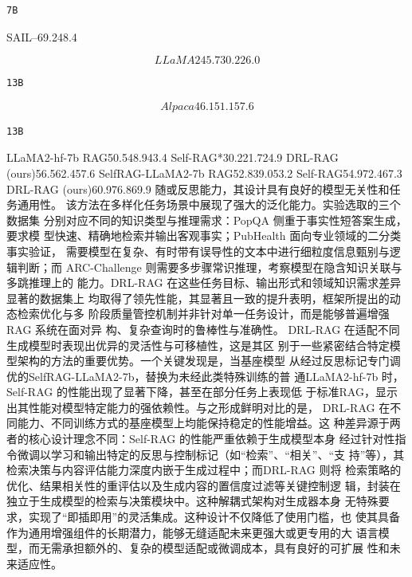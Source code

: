 \documentclass[12pt,a4paper,openright,UTF8]{ctexbook}
\begin{document}
\begin{lstlisting}
7B
\end{lstlisting}
SAIL–69.248.4

\begin{equation*}
LLaMA245.730.226.0
\end{equation*}

\begin{lstlisting}
13B
\end{lstlisting}

\begin{equation*}
Alpaca46.151.157.6
\end{equation*}

\begin{lstlisting}
13B
\end{lstlisting}
LLaMA2-hf-7b RAG50.548.943.4 Self-RAG*30.221.724.9 DRL-RAG (ours)56.562.457.6 SelfRAG-LLaMA2-7b RAG52.839.053.2 Self-RAG54.972.467.3 DRL-RAG (ours)60.976.869.9 随或反思能力，其设计具有良好的模型无关性和任务通用性。 该方法在多样化任务场景中展现了强大的泛化能力。实验选取的三个数据集 分别对应不同的知识类型与推理需求：PopQA 侧重于事实性短答案生成，要求模 型快速、精确地检索并输出客观事实；PubHealth 面向专业领域的二分类事实验证， 需要模型在复杂、有时带有误导性的文本中进行细粒度信息甄别与逻辑判断；而 ARC-Challenge 则需要多步骤常识推理，考察模型在隐含知识关联与多跳推理上的 能力。DRL-RAG 在这些任务目标、输出形式和领域知识需求差异显著的数据集上 均取得了领先性能，其显著且一致的提升表明，框架所提出的动态检索优化与多 阶段质量管控机制并非针对单一任务设计，而是能够普遍增强RAG 系统在面对异 构、复杂查询时的鲁棒性与准确性。 DRL-RAG 在适配不同生成模型时表现出优异的灵活性与可移植性，这是其区 别于一些紧密结合特定模型架构的方法的重要优势。一个关键发现是，当基座模型 从经过反思标记专门调优的SelfRAG-LLaMA2-7b，替换为未经此类特殊训练的普 通LLaMA2-hf-7b 时，Self-RAG 的性能出现了显著下降，甚至在部分任务上表现低 于标准RAG，显示出其性能对模型特定能力的强依赖性。与之形成鲜明对比的是， DRL-RAG 在不同能力、不同训练方式的基座模型上均能保持稳定的性能增益。这 种差异源于两者的核心设计理念不同：Self-RAG 的性能严重依赖于生成模型本身 经过针对性指令微调以学习和输出特定的反思与控制标记（如“检索”、“相关”、“支 持”等），其检索决策与内容评估能力深度内嵌于生成过程中；而DRL-RAG 则将 检索策略的优化、结果相关性的重评估以及生成内容的置信度过滤等关键控制逻 辑，封装在独立于生成模型的检索与决策模块中。这种解耦式架构对生成器本身 无特殊要求，实现了“即插即用”的灵活集成。这种设计不仅降低了使用门槛，也 使其具备作为通用增强组件的长期潜力，能够无缝适配未来更强大或更专用的大 语言模型，而无需承担额外的、复杂的模型适配或微调成本，具有良好的可扩展 性和未来适应性。
\end{document}
